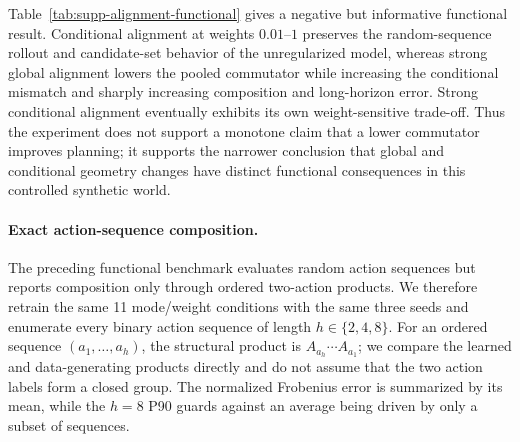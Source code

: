 \documentclass{article}
\begin{document}
Table~\ref{tab:supp-alignment-functional} gives a negative but informative
functional result. Conditional alignment at weights $0.01$--$1$ preserves the
random-sequence rollout and candidate-set behavior of the unregularized model,
whereas strong global alignment lowers the pooled commutator while increasing
the conditional mismatch and sharply increasing composition and long-horizon
error. Strong conditional alignment eventually exhibits its own weight-sensitive
trade-off. Thus the experiment does not support a monotone claim that a lower
commutator improves planning; it supports the narrower conclusion that global
and conditional geometry changes have distinct functional consequences in this
controlled synthetic world.

\paragraph{Exact action-sequence composition.}
The preceding functional benchmark evaluates random action sequences but reports
composition only through ordered two-action products. We therefore retrain the
same 11 mode/weight conditions with the same three seeds and enumerate every
binary action sequence of length $h\in\{2,4,8\}$. For an ordered sequence
$(a_1,\ldots,a_h)$, the structural product is
$A_{a_h}\cdots A_{a_1}$; we compare the learned and data-generating products
directly and do not assume that the two action labels form a closed group. The
normalized Frobenius error is summarized by its mean, while the $h=8$ P90
guards against an average being driven by only a subset of sequences.
\end{document}
